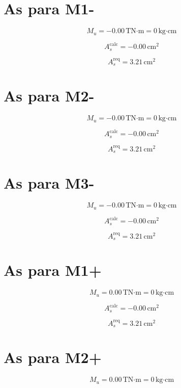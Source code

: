 \documentclass[12pt]{article}
\begin{document}
\section*{ As para M1- }

\[
M_u = -0.00\,\text{TN·m} = 0\,\text{kg·cm}
\]

\[
A_s^{\text{calc}} = -0.00\,\text{cm}^2
\]

\[
A_s^{\text{req}} = 3.21\,\text{cm}^2
\]

\vspace{0.5cm}

\section*{ As para M2- }

\[
M_u = -0.00\,\text{TN·m} = 0\,\text{kg·cm}
\]

\[
A_s^{\text{calc}} = -0.00\,\text{cm}^2
\]

\[
A_s^{\text{req}} = 3.21\,\text{cm}^2
\]

\vspace{0.5cm}

\section*{ As para M3- }

\[
M_u = -0.00\,\text{TN·m} = 0\,\text{kg·cm}
\]

\[
A_s^{\text{calc}} = -0.00\,\text{cm}^2
\]

\[
A_s^{\text{req}} = 3.21\,\text{cm}^2
\]

\vspace{0.5cm}

\section*{ As para M1+ }

\[
M_u = 0.00\,\text{TN·m} = 0\,\text{kg·cm}
\]

\[
A_s^{\text{calc}} = -0.00\,\text{cm}^2
\]

\[
A_s^{\text{req}} = 3.21\,\text{cm}^2
\]

\vspace{0.5cm}

\section*{ As para M2+ }

\[
M_u = 0.00\,\text{TN·m} = 0\,\text{kg·cm}
\]
\end{document}
